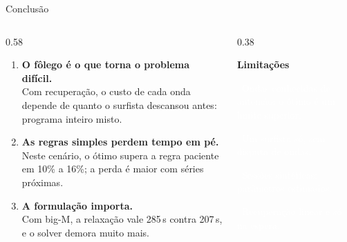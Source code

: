 \documentclass[aspectratio=169,10pt,xcolor=table]{beamer}
\newcommand{\limi}[1]{\textcolor{laranja}{\textbullet}~\textcolor{white}{#1}\par\smallskip}
\begin{document}
\begin{frame}{Conclusão}
\begin{columns}[T]
\begin{column}{0.58\textwidth}
\begin{enumerate}
\setlength{\itemsep}{6pt}
\item[\color{laranja}\textbf{1}] \textbf{O fôlego é o que torna o problema difícil.}\\
{\small\color{texto2}Com recuperação, o custo de cada onda depende de quanto o surfista descansou antes: programa inteiro misto.}
\item[\color{laranja}\textbf{2}] \textbf{As regras simples perdem tempo em pé.}\\
{\small\color{texto2}Neste cenário, o ótimo supera a regra paciente em 10\% a 16\%; a perda é maior com séries próximas.}
\item[\color{laranja}\textbf{3}] \textbf{A formulação importa.}\\
{\small\color{texto2}Com big-M, a relaxação vale 285\,s contra 207\,s, e o solver demora muito mais.}
\end{enumerate}
\end{column}
\begin{column}{0.38\textwidth}
\begin{tcolorbox}[colback=marmedio, colframe=marmedio, coltext=white]
{\color{laranja}\bfseries Limitações}\par\smallskip
\footnotesize\color{white}
\limi{Ondas conhecidas de antemão: o ótimo é um limite superior.}
\limi{Um surfista só, sem disputa de ondas.}
\limi{Sessões sintéticas; parâmetros estimados.}
\limi{Recuperação linear e só na espera.}
\end{tcolorbox}
\end{column}
\end{columns}
\end{frame}
\end{document}

